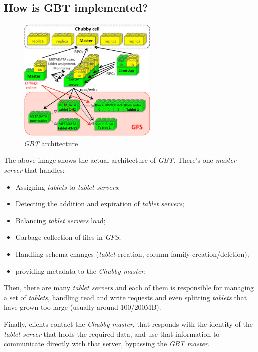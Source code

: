 \subsection{How is GBT implemented?}
\begin{figure}[h!]
    \centering
    \includegraphics[width=0.6\textwidth]{images/gbt-design-detailed.png}
    \caption{\emph{GBT} architecture}
\end{figure}

\noindent
The above image shows the actual architecture of \emph{GBT}. There's one
\emph{master server} that handles:
\begin{itemize}
    \item Assigning \emph{tablets} to \emph{tablet servers};
    \item Detecting the addition and expiration of \emph{tablet servers};
    \item Balancing \emph{tablet servers} load;
    \item Garbage collection of files in \emph{GFS};
    \item Handling schema changes (\emph{tablet} creation, column family
    creation/deletion);
    \item providing metadata to the \emph{Chubby master};
\end{itemize}
Then, there are many \emph{tablet servers} and each of them is responsible for
managing a set of \emph{tablets}, handling read and write requests and even splitting
\emph{tablets} that have grown too large (usually around 100/200MB).

Finally, clients contact the \emph{Chubby master}, that responds with the
identity of the \emph{tablet server} that holds the required data, and use that
information to communicate directly with that server, bypassing the \emph{GBT
master}.

